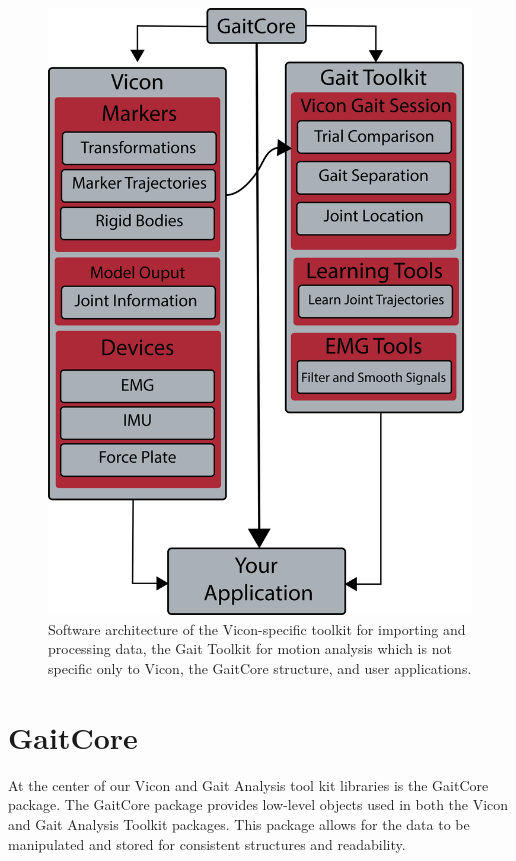 \begin{figure}[hbt]
    \centering
    \includegraphics[scale=0.20]{images/software/software.png}
    \caption[Software Architecture]{Software architecture of the Vicon-specific toolkit for importing and processing data, the Gait Toolkit for motion analysis which is not specific only to Vicon, the GaitCore structure, and user applications.}
    \label{fig:software}
\end{figure}


\section{GaitCore}
At the center of our Vicon and Gait Analysis tool kit libraries is the GaitCore package. The GaitCore package provides low-level objects used in both the Vicon and Gait Analysis Toolkit packages. This package allows for the data to be manipulated and stored for consistent structures and readability.

